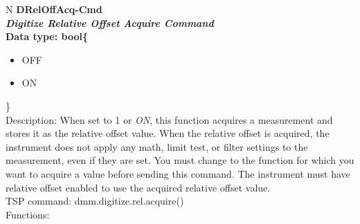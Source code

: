 \documentclass[openany]{article}
\begin{document}
		\begin{tabular}{N}
			\hline
			\bfseries DRelOffAcq-Cmd\label{pv:dreloffacq-cmd} \\ \hline
			\emph{Digitize Relative Offset Acquire Command} \\
			Data type: bool\{\begin{itemize}[noitemsep]
				\small
				\item[] OFF
				\item[] ON
			\end{itemize}\} \\
			Description: When set to 1 or \emph{ON}, this function acquires a measurement and stores it as the relative offset value. When the relative offset is acquired, the instrument does not apply any math, limit test, or filter settings to the measurement, even if they are set. You must change to the function for which you want to acquire a value before sending this command. The instrument must have relative offset enabled to use the acquired relative offset value. \\
			TSP command: dmm.digitize.rel.acquire() \\
			Functions: \\
			\arrayrulecolor{\FuncTableBorderColor}

		\end{tabular}
\end{document}
